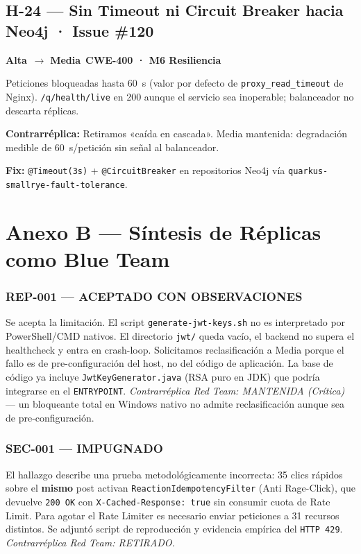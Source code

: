 \documentclass[10pt,a4paper]{article}
\newcommand{\code}[1]{\nolinkurl{#1}}
\newcommand{\badgeAlta}{\colorbox{orange!20}{\textcolor{orange!90!black}{\textbf{\footnotesize Alta}}}}
\newcommand{\badgeMedia}{\colorbox{yellow!35}{\textcolor{brown!90!black}{\textbf{\footnotesize Media}}}}
\begin{document}
\subsection*{H-24 — Sin Timeout ni Circuit Breaker hacia Neo4j · Issue \#120}
\badgeAlta\ $\rightarrow$ \badgeMedia\ \quad \textbf{CWE-400 · M6 Resiliencia}

\noindent Peticiones bloqueadas hasta 60~s (valor por defecto de \code{proxy\_read\_timeout} de Nginx). \code{/q/health/live} en 200 aunque el servicio sea inoperable; balanceador no descarta réplicas.\par
\noindent\textbf{Contrarréplica:} Retiramos «caída en cascada». Media mantenida: degradación medible de 60~s/petición sin señal al balanceador.\par
\noindent\textbf{Fix:} \code{@Timeout(3s)} + \code{@CircuitBreaker} en repositorios Neo4j vía \code{quarkus-smallrye-fault-tolerance}.

\newpage
\section*{Anexo B — Síntesis de Réplicas como Blue Team}

\subsubsection*{REP-001 — ACEPTADO CON OBSERVACIONES}
Se acepta la limitación. El script \code{generate-jwt-keys.sh} no es interpretado por PowerShell/CMD nativos. El directorio \code{jwt/} queda vacío, el backend no supera el healthcheck y entra en crash-loop. Solicitamos reclasificación a Media porque el fallo es de pre-configuración del host, no del código de aplicación. La base de código ya incluye \code{JwtKeyGenerator.java} (RSA puro en JDK) que podría integrarse en el \code{ENTRYPOINT}. \textit{Contrarréplica Red Team: MANTENIDA (Crítica)} — un bloqueante total en Windows nativo no admite reclasificación aunque sea de pre-configuración.

\subsubsection*{SEC-001 — IMPUGNADO}
El hallazgo describe una prueba metodológicamente incorrecta: 35 clics rápidos sobre el \textbf{mismo} post activan \code{ReactionIdempotencyFilter} (Anti Rage-Click), que devuelve \code{200 OK} con \code{X-Cached-Response: true} sin consumir cuota de Rate Limit. Para agotar el Rate Limiter es necesario enviar peticiones a 31 recursos distintos. Se adjuntó script de reproducción y evidencia empírica del \code{HTTP 429}. \textit{Contrarréplica Red Team: RETIRADO.}
\end{document}
